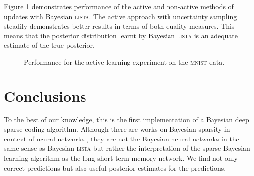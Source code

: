 \documentclass{article}
\begin{document}
  Figure \ref{fig:active_learning_mnist} demonstrates performance of the active and non-active methods of updates with Bayesian \textsc{lista}. The active approach with uncertainty sampling steadily demonstrates better results in terms of both quality measures. This means that the posterior distribution learnt by Bayesian \textsc{lista} is an adequate estimate of the true posterior.
  \begin{figure}[h]
  \centering
  \caption{Performance for the active learning experiment on the \textsc{mnist} data. }
  \label{fig:active_learning_mnist}
  \end{figure}
  
  \section{Conclusions}
  \label{sec:conclusions}
  To the best of our knowledge, this is the first implementation of a Bayesian deep sparse coding algorithm. Although there are works on Bayesian sparsity in context of neural networks \cite{he2017bayesian}, they are not the Bayesian neural networks in the same sense as Bayesian \textsc{lista} but rather the interpretation of the sparse Bayesian  learning algorithm as the long short-term memory network. We find not only correct predictions but also useful posterior estimates for the predictions.
  
\end{document}
